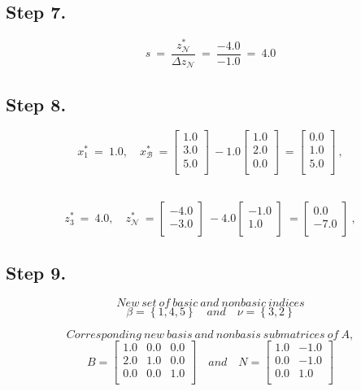 \documentclass [12pt] {article}
\begin{document}
\subsection{Step 7.}
\[
s \ =\ \frac{z_{\mathcal N}^{*}}{ \Delta z_{\mathcal N}}\ =\ \frac{-4.0}{-1.0}\ =\ 4.0
\]
\subsection{Step 8.}
\[
x_{1}^{*}\ =\ 1.0, \quad x_{\mathcal B}^{*}\ =\begin{bmatrix}
1.0 \\ 3.0 \\ 5.0 \\ 
\end{bmatrix}\ -1.0\begin{bmatrix}
1.0 \\ 2.0 \\ 0.0 \\ 
\end{bmatrix}\ =\begin{bmatrix}
0.0 \\ 1.0 \\ 5.0 \\ 
\end{bmatrix}\ ,
\]
\

\[
z_{3}^{*}\ =\ 4.0, \quad z_{\mathcal N}^{*}\ =\begin{bmatrix}
-4.0 \\ -3.0 \\ 
\end{bmatrix}\ -4.0\begin{bmatrix}
-1.0 \\ 1.0 \\ 
\end{bmatrix}\ =\begin{bmatrix}
0.0 \\ -7.0 \\ 
\end{bmatrix}\ ,
\]
\subsection{Step 9.}

\[ New\ set\  of\  basic\  and\  nonbasic\  indices \]
\[
\beta= \left\{1, 4, 5\right\} \quad and \quad  \nu=\left\{3, 2\right\}
\]

\[
Corresponding\ new\ basis\ and\ nonbasis\ submatrices\ of\ A,
\]
\[
B =
\begin{bmatrix}
1.0 & 0.0 & 0.0 \\ 2.0 & 1.0 & 0.0 \\ 0.0 & 0.0 & 1.0 \\ 
\end{bmatrix} \quad and \quad
\mathit{N} =
\begin{bmatrix}
1.0 & -1.0 \\ 0.0 & -1.0 \\ 0.0 & 1.0 \\ 
\end{bmatrix}
\]
\end{document}
